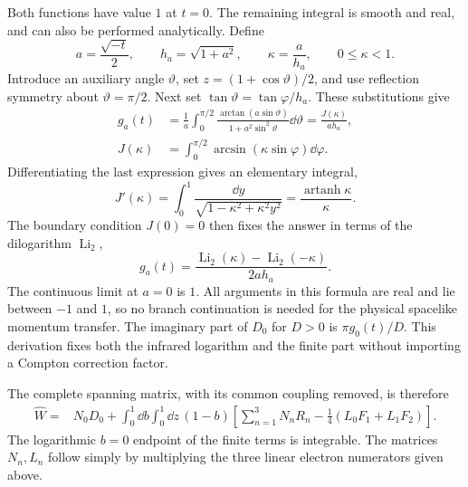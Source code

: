 Both functions have value $1$ at $t=0$. The remaining integral is
smooth and real, and can also be performed analytically. Define
\begin{equation}
 a=\frac{\sqrt{-t}}2,\qquad h_a=\sqrt{1+a^2},\qquad
 \kappa=\frac{a}{h_a},\qquad 0\leq\kappa<1.
\end{equation}
Introduce an auxiliary angle $\vartheta$, set $z=(1+\cos\vartheta)/2$, and use reflection symmetry
about $\vartheta=\pi/2$. Next set $\tan\vartheta=\tan\varphi/h_a$.
These substitutions give
\begin{align}
 g_a(t)&=\frac1a\int_0^{\pi/2}
       \frac{\arctan(a\sin\vartheta)}{1+a^2\sin^2\vartheta}\dd\vartheta
       =\frac{J(\kappa)}{a h_a},\\
 J(\kappa)&=\int_0^{\pi/2}\arcsin(\kappa\sin\varphi)\dd\varphi.
\end{align}
Differentiating the last expression gives an elementary integral,
\begin{equation}
 J'(\kappa)=\int_0^1\frac{\dd y}
                  {\sqrt{1-\kappa^2+\kappa^2y^2}}
             =\frac{\operatorname{artanh}\kappa}{\kappa}.
\end{equation}
The boundary condition $J(0)=0$ then fixes the answer in terms
of the dilogarithm $\operatorname{Li}_2$,
\begin{equation}
 \boxed{g_a(t)=\frac{\operatorname{Li}_2(\kappa)
                         -\operatorname{Li}_2(-\kappa)}{2a h_a}.}
 \label{eq:comp-supp-box-dilog}
\end{equation}
The continuous limit at $a=0$ is $1$. All arguments in this formula
are real and lie between $-1$ and $1$, so no branch continuation
is needed for the physical spacelike momentum transfer.
The imaginary part of $D_0$ for $D>0$ is
$\pi g_0(t)/D$. This derivation fixes both the infrared logarithm
and the finite part without importing a Compton correction factor.

The complete spanning matrix, with its common coupling removed, is
therefore
\begin{equation}
 \begin{aligned}
 \widehat W={}&N_0D_0+\int_0^1\dd b\int_0^1\dd z\,(1-b)
 \left[\sum_{n=1}^3N_nR_n-\frac14(L_0F_1+L_1F_2)\right].
 \end{aligned}
 \label{eq:comp-supp-spanning-integrated}
\end{equation}
The logarithmic $b=0$ endpoint of the finite terms is integrable.
The matrices $N_n,L_n$ follow simply by multiplying the three
linear electron numerators given above.


